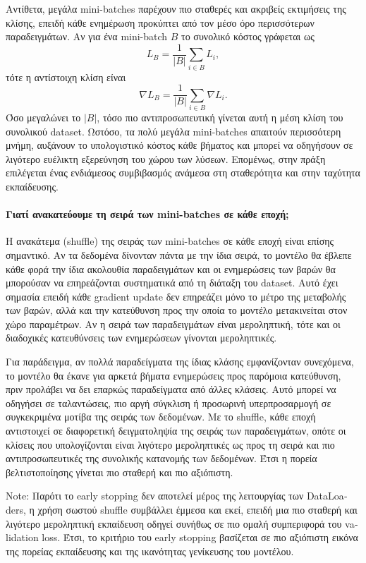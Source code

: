 \documentclass[11pt,a4paper]{article}
\begin{document}
Αντίθετα, μεγάλα \textlatin{mini-batches} παρέχουν πιο σταθερές και ακριβείς εκτιμήσεις της κλίσης, επειδή κάθε ενημέρωση προκύπτει από τον μέσο 
όρο περισσότερων παραδειγμάτων. Αν για ένα \textlatin{mini-batch} \(B\) το συνολικό κόστος γράφεται ως
\[
L_B = \frac{1}{|B|}\sum_{i \in B} L_i,
\]
τότε η αντίστοιχη κλίση είναι
\[
\nabla L_B = \frac{1}{|B|}\sum_{i \in B} \nabla L_i.
\]
Όσο μεγαλώνει το \(|B|\), τόσο πιο αντιπροσωπευτική γίνεται αυτή η μέση κλίση του συνολικού \textlatin{dataset}. Ωστόσο, τα πολύ μεγάλα 
\textlatin{mini-batches} απαιτούν περισσότερη μνήμη, αυξάνουν το υπολογιστικό κόστος κάθε βήματος και μπορεί να οδηγήσουν σε λιγότερο ευέλικτη 
εξερεύνηση του χώρου των λύσεων. Επομένως, στην πράξη επιλέγεται ένας ενδιάμεσος συμβιβασμός ανάμεσα στη σταθερότητα και στην ταχύτητα εκπαίδευσης.

\paragraph{Γιατί ανακατεύουμε τη σειρά των \textlatin{mini-batches} σε κάθε εποχή;}

Η ανακάτεμα (\textlatin{shuffle}) της σειράς των \textlatin{mini-batches} σε κάθε εποχή είναι επίσης σημαντικό. Αν τα δεδομένα δίνονταν πάντα με την 
ίδια σειρά, το μοντέλο θα έβλεπε κάθε φορά την ίδια ακολουθία παραδειγμάτων και οι ενημερώσεις των βαρών θα μπορούσαν να επηρεάζονται συστηματικά από 
τη διάταξη του \textlatin{dataset}. Αυτό έχει σημασία επειδή κάθε \textlatin{gradient update} δεν επηρεάζει μόνο το μέτρο της μεταβολής των βαρών, 
αλλά και την κατεύθυνση προς την οποία το μοντέλο μετακινείται στον χώρο παραμέτρων. Αν η σειρά των παραδειγμάτων είναι μεροληπτική, τότε και οι 
διαδοχικές κατευθύνσεις των ενημερώσεων γίνονται μεροληπτικές.

Για παράδειγμα, αν πολλά παραδείγματα της ίδιας κλάσης εμφανίζονταν συνεχόμενα, το μοντέλο θα έκανε για αρκετά βήματα ενημερώσεις προς παρόμοια 
κατεύθυνση, πριν προλάβει να δει επαρκώς παραδείγματα από άλλες κλάσεις. Αυτό μπορεί να οδηγήσει σε ταλαντώσεις, πιο αργή σύγκλιση ή προσωρινή 
υπερπροσαρμογή σε συγκεκριμένα μοτίβα της σειράς των δεδομένων. Με το \textlatin{shuffle}, κάθε εποχή αντιστοιχεί σε διαφορετική δειγματοληψία 
της σειράς των παραδειγμάτων, οπότε οι κλίσεις που υπολογίζονται είναι λιγότερο μεροληπτικές ως προς τη σειρά και πιο αντιπροσωπευτικές της συνολικής 
κατανομής των δεδομένων. Έτσι η πορεία βελτιστοποίησης γίνεται πιο σταθερή και πιο αξιόπιστη.

\textlatin{Note}: Παρότι το \textlatin{early stopping} δεν αποτελεί μέρος της λειτουργίας των \textlatin{DataLoaders}, η χρήση σωστού 
\textlatin{shuffle} συμβάλλει έμμεσα και εκεί, επειδή μια πιο σταθερή και λιγότερο μεροληπτική εκπαίδευση οδηγεί συνήθως σε πιο ομαλή συμπεριφορά 
του \textlatin{validation loss}. Έτσι, το κριτήριο του \textlatin{early stopping} βασίζεται σε πιο αξιόπιστη εικόνα της πορείας εκπαίδευσης και 
της ικανότητας γενίκευσης του μοντέλου.
\end{document}

